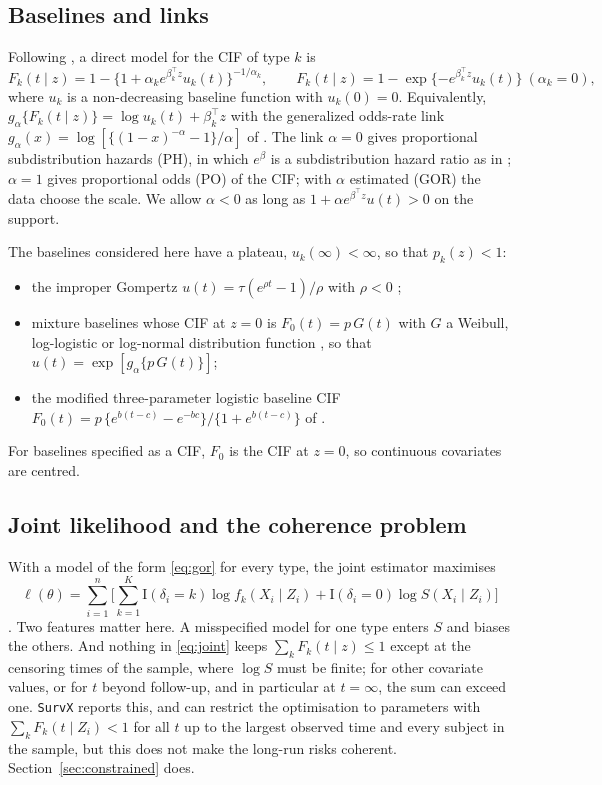 \documentclass[11pt]{article}
\newcommand{\I}{\mathrm{I}}
\newcommand{\T}{\top}
\begin{document}
\subsection{Baselines and links}
Following \citet{jeong2007}, a direct model for the CIF of type $k$ is
\begin{equation}\label{eq:gor}
F_k(t \mid z) = 1 - \{1 + \alpha_k e^{\beta_k^\T z} u_k(t)\}^{-1/\alpha_k}, \qquad
F_k(t \mid z) = 1 - \exp\{-e^{\beta_k^\T z} u_k(t)\} \ (\alpha_k = 0),
\end{equation}
where $u_k$ is a non-decreasing baseline function with $u_k(0) = 0$. Equivalently,
$g_{\alpha}\{F_k(t \mid z)\} = \log u_k(t) + \beta_k^\T z$ with the generalized odds-rate link
$g_\alpha(x) = \log[\{(1-x)^{-\alpha} - 1\}/\alpha]$ of \citet{dabrowska1988}. The link $\alpha = 0$
gives proportional subdistribution hazards (PH), in which $e^{\beta}$ is a subdistribution hazard
ratio as in \citet{fine1999}; $\alpha = 1$ gives proportional odds (PO) of the CIF; with $\alpha$
estimated (GOR) the data choose the scale. We allow $\alpha < 0$ as long as
$1 + \alpha e^{\beta^\T z} u(t) > 0$ on the support.

The baselines considered here have a plateau, $u_k(\infty) < \infty$, so that $p_k(z) < 1$:
\begin{itemize}
\item the improper Gompertz $u(t) = \tau(e^{\rho t} - 1)/\rho$ with $\rho < 0$ \citep{jeong2006};
\item mixture baselines whose CIF at $z = 0$ is $F_0(t) = p\,G(t)$ with $G$ a Weibull,
log-logistic or log-normal distribution function \citep{larson1985,cheng2009}, so that
$u(t) = \exp[g_\alpha\{p\,G(t)\}]$;
\item the modified three-parameter logistic baseline CIF
$F_0(t) = p\,\{e^{b(t-c)} - e^{-bc}\}/\{1 + e^{b(t-c)}\}$ of \citet{cheng2009}.
\end{itemize}
For baselines specified as a CIF, $F_0$ is the CIF at $z = 0$, so continuous covariates are centred.

\subsection{Joint likelihood and the coherence problem}
With a model of the form \eqref{eq:gor} for every type, the joint estimator maximises
\begin{equation}\label{eq:joint}
\ell(\theta) = \sum_{i=1}^n \Big[\sum_{k=1}^K \I(\delta_i = k)\log f_k(X_i \mid Z_i)
  + \I(\delta_i = 0) \log S(X_i \mid Z_i)\Big]
\end{equation}
\citep{jeong2007}. Two features matter here. A misspecified model for one type enters $S$ and
biases the others. And nothing in \eqref{eq:joint} keeps $\sum_k F_k(t \mid z) \le 1$ except at the
censoring times of the sample, where $\log S$ must be finite; for other covariate values, or for
$t$ beyond follow-up, and in particular at $t = \infty$, the sum can exceed one. \texttt{SurvX}
reports this, and can restrict the optimisation to parameters with
$\sum_k F_k(t \mid Z_i) < 1$ for all $t$ up to the largest observed time and every subject in the
sample, but this does not make the long-run risks coherent. Section~\ref{sec:constrained} does.
\end{document}
